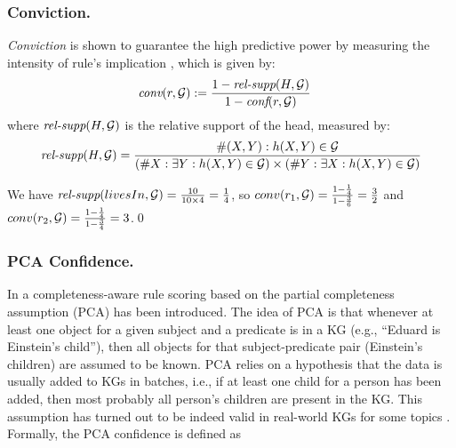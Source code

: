  

\subsubsection{Conviction.} \textit{Conviction} is shown to guarantee the high predictive power \cite{Azevedo2007} by measuring the intensity of rule's implication \cite{metrics-summary}, which is given by:
\begin{align*}
\textit{conv}(r,\mathcal{G}) & := \frac{1 - \textit{rel-supp}(H, \mathcal{G})}{1-\textit{conf}(r,\mathcal{G})}
\end{align*}
where $\textit{rel-supp}(H, \mathcal{G})$ is the relative support of the head, measured by:
\begin{align*}
\textit{rel-supp}(H, \mathcal{G}) = \dfrac{\#(X,Y):h(X,Y)\in \mathcal{G}}{(\#X:\exists Y:h(X,Y)\in \mathcal{G})\times(\#Y:\exists X:h(X,Y)\in \mathcal{G})}
\end{align*}
\begin{example}
We have $\textit{rel-supp}(livesIn, \mathcal{G}) = \frac{10}{10 \times 4} = \frac{1}{4}$, so $conv(r_1,\mathcal{G}) = \frac{1-\frac{1}{4}}{1-\frac{3}{6}} = \frac{3}{2}$ and $conv(r_2,\mathcal{G}) = \frac{1-\frac{1}{4}}{1-\frac{3}{4}} = 3$.\qed
\end{example}
\subsubsection{PCA Confidence.} In \cite{amie} a completeness-aware rule scoring based
on the partial completeness assumption (PCA) has been introduced. The idea of PCA is that
whenever at least one object for a given subject and a predicate is in a KG (e.g., ``Eduard
is Einstein’s child''), then all objects for that subject-predicate pair (Einstein’s children)
are assumed to be known. PCA relies on a hypothesis that the data is usually
added to KGs in batches, i.e., if at least one child for a person has been added, then most probably
all person's children are present in the KG. This assumption has turned out to be indeed valid in real-world KGs for some topics \cite{amie}. 
Formally, 
the PCA confidence is defined as

